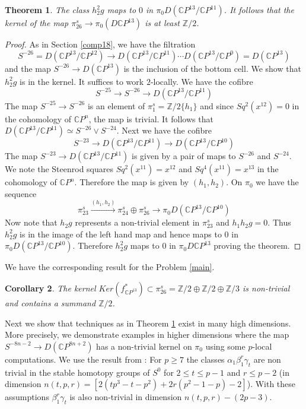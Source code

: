 \documentclass[a4paper,leqno,12pt]{amsart}
\theoremstyle{plain}
\newtheorem{theorem}{Theorem}[section]
\newtheorem{cor}[theorem]{Corollary}
\theoremstyle{definition}
\numberwithin{equation}{section}
\begin{document}
\begin{theorem}\label{main26}
The class $h_2^2g$ maps to $0$ in $\pi_0D({\mathbb{C}} P^{13}/{\mathbb{C}} P^{11})$. It follows that the kernel of the map $\pi_{26}^s \to \pi_0(D{\mathbb{C}} P^{13})$ is at least ${\mathbb{Z}}/2$. 
\end{theorem}

\begin{proof}
As in Section \ref{comp18}, we have the filtration 
$$
S^{-26}= D({\mathbb{C}} P^{13}/{\mathbb{C}} P^{12}) \to D({\mathbb{C}} P^{13}/{\mathbb{C}} P^{11}) \cdots D({\mathbb{C}} P^{13}/{\mathbb{C}} P^0)= D({\mathbb{C}} P^{13})
$$
and the map $S^{-26} \to D({\mathbb{C}} P^{13})$ is the inclusion of the bottom cell. We show that $h_2^2g$ is in the kernel. It suffices to work $2$-locally. We have the cofibre 
$$S^{-25} \to S^{-26} \to D({\mathbb{C}} P^{13}/{\mathbb{C}} P^{11})  $$
The map $S^{-25} \to S^{-26}$ is an element of $\pi_1^s = {\mathbb{Z}}/2\{h_1\}$ and since $Sq^2(x^{12})=0$ in the cohomology of ${\mathbb{C}} P^n$,  the map is trivial. It follows that $D({\mathbb{C}} P^{13}/{\mathbb{C}} P^{11}) \simeq S^{-26}\vee S^{-24}$. Next we have the cofibre 
$$S^{-23} \to D({\mathbb{C}} P^{13}/ {\mathbb{C}} P^{11}) \to D({\mathbb{C}} P^{13}/{\mathbb{C}} P^{10})  $$
The map $S^{-23} \to D({\mathbb{C}} P^{13}/{\mathbb{C}} P^{11})$ is given by a pair of maps to $ S^{-26}$ and $S^{-24}$. We note the Steenrod squares $Sq^2(x^{11})=x^{12}$ and $Sq^4(x^{11})=x^{13}$ in the cohomology of ${\mathbb{C}} P^n$. Therefore the map is given by $(h_1,h_2)$. On $\pi_0$ we have the sequence 
$$\pi_{23}^s \stackrel{(h_1,h_2)}{ \to} \pi_{24}^s \oplus \pi_{26}^s \to \pi_0 D({\mathbb{C}} P^{13}/{\mathbb{C}} P^{10})$$ 
Now note that $h_2g$ represents a non-trivial element in $\pi_{23}^s$ and $h_1h_2g=0$. Thus $h_2^2g$ is in the image of the left hand map and hence maps to $0$ in $ \pi_0 D({\mathbb{C}} P^{13}/ {\mathbb{C}} P^{10})$. Therefore $h_2^2g$ maps to $0$ in $\pi_0D{\mathbb{C}} P^{13}$ proving the theorem. 
\end{proof} 

We have the corresponding result for the Problem \ref{main}.
\begin{cor}\label{ker26}
The kernel ${\mathit{Ker}}(f_{{\mathbb{C}} P^{13}}^\ast)\subset \pi_{26}^s = {\mathbb{Z}}/2 \oplus {\mathbb{Z}}/2 \oplus {\mathbb{Z}}/3$ is non-trivial and contains a summand ${\mathbb{Z}}/2$.
\end{cor}

Next we show that techniques as in Theorem \ref{main26} exist in many high dimensions. More precisely, we demonstrate examples in higher dimensions where the map $S^{-8n-2} \to D({\mathbb{C}} P^{8n+2})$ has a non-trivial kernel on $\pi_0$ using some $p$-local computations. We use the result from \cite{CNL96} :  For $p\geq 7$ the classes $\alpha_1\beta_1^r\gamma_t$ are non trivial in the stable homotopy groups of $S^0$ for $2\leq t \leq p-1$ and $r\leq p-2$ (in dimension $n(t,p,r)= [2(tp^3 - t - p^2) +2r(p^2 - 1 - p) -2]$).  With these assumptions $\beta_1^r\gamma_t$ is also non-trivial in dimension $n(t,p,r)-(2p -3)$. 
\end{document}
